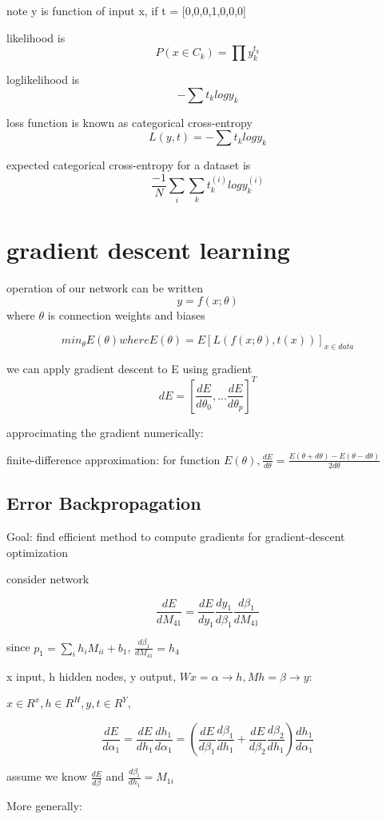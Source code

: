 \documentclass[10pt]{article}
\theoremstyle{break}
\begin{document}
note y is function of input x, if t = [0,0,0,1,0,0,0]

likelihood is 
$$P(x\in C_k)=\prod y_k^{t_k}$$

loglikelihood is 
$$-\sum t_k log y_k$$

loss function is known as categorical cross-entropy 
$$L(y,t) = -\sum t_k log y_k$$

expected categorical cross-entropy for a dataset is 
$$\frac{-1}{N}\sum_i\sum_k t_k^{(i)} log y_k^{(i)}$$

\section{gradient descent learning}
operation of our network can be written 
$$y=f(x;\theta)$$ where $\theta$ is connection weights and biases

$$min_\theta E(\theta) where E(\theta) = E[L(f(x;\theta),t(x))]_{x\in data}$$

we can apply gradient descent to E using gradient 
$$dE = [\frac{dE}{d\theta_0},...\frac{dE}{d\theta_p}]^T$$


approcimating the gradient numerically: 

finite-difference approximation: for function $E(\theta), \frac{dE}{d\theta}=\frac{E(\theta+d\theta)-E(\theta-d\theta)}{2d\theta}$

\subsection{Error Backpropagation}
Goal: find efficient method to compute gradients for gradient-descent optimization

consider network 

$$\frac{dE}{dM_{41}}=\frac{dE}{dy_1}\frac{dy_1}{d\beta_1}\frac{d\beta_1}{dM_{41}}$$

since $p_1=\sum_i h_i M_{ii}+b_1$, $\frac{d\beta_1}{dM_{41}}=h_4$


x input, h hidden nodes, y output, $Wx=\alpha \rightarrow h, Mh=\beta \rightarrow y$:

$x\in R^x, h\in R^H, y,t\in R^Y$,

$$\frac{dE}{d\alpha_1}=\frac{dE}{dh_1}\frac{dh_1}{d\alpha_1}=\left(\frac{dE}{d\beta_1}\frac{d\beta_1}{dh_1}+\frac{dE}{d\beta_2}\frac{d\beta_2}{dh_1}\right)\frac{dh_1}{d\alpha_1}$$

assume we know $\frac{dE}{d\beta}$ and $\frac{d\beta_i}{dh_1}=M_{1i}$

More generally:
\end{document}
